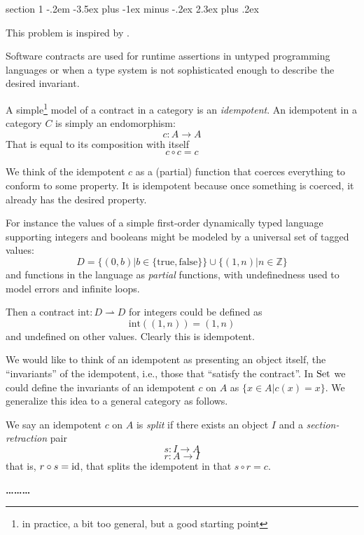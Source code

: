 \documentclass[12pt]{article}
\makeatletter
\newenvironment{problem}{\@startsection
       {section}
       {1}
       {-.2em}
       {-3.5ex plus -1ex minus -.2ex}
       {2.3ex plus .2ex}
       {\pagebreak[3]%
       \large\bf\noindent{Problem }
       }
       }
       {%
       \begin{center}\large\bf \ldots\ldots\ldots\end{center}}
\makeatother
\begin{document}
\begin{problem}{}
  
  This problem is inspired by \citet{scott1980relating}.

  Software contracts \citep{ff02} are used for runtime
  assertions in untyped programming languages or when a type system is
  not sophisticated enough to describe the desired invariant.

  A simple\footnote{in practice, a bit too general, but a good
  starting point} model of a contract in a category is an
  \emph{idempotent}. An idempotent in a category $C$ is simply an
  endomorphism:
  \[ c : A \to A \]
  That is equal to its composition with itself
  \[ c \circ c = c \]

  We think of the idempotent $c$ as a (partial) function that coerces
  everything to conform to some property. It is idempotent because
  once something is coerced, it already has the desired property.

  For instance the values of a simple first-order dynamically typed
  language supporting integers and booleans might be modeled by a
  universal set of tagged values:
  \[ D = \{ (0, b) | b \in \{ \textrm{true}, \textrm{false}\}\} \cup \{ (1, n) | n \in \mathbb Z \} \]
  and functions in the language as \emph{partial} functions, with
  undefinedness used to model errors and infinite loops.

  Then a contract $\textrm{int} : D \rightharpoonup D$ for integers
  could be defined as
  \[ \textrm{int}((1,n)) = (1, n) \]
  and undefined on other values. Clearly this is idempotent.

  We would like to think of an idempotent as presenting an object
  itself, the ``invariants'' of the idempotent, i.e., those that
  ``satisfy the contract''. In $\textrm{Set}$ we could define the invariants
  of an idempotent $c$ on $A$ as $\{ x \in A | c(x) = x \}$. We
  generalize this idea to a general category as follows.

  We say an idempotent $c$ on $A$ is \emph{split} if there exists an
  object $I$ and a \emph{section-retraction} pair
  \[ s : I \to A \]
  \[ r : A \to I \]
  that is, $r \circ s = \textrm{id}$, that splits the idempotent in that $s
  \circ r = c$.


\end{problem}
\end{document}
